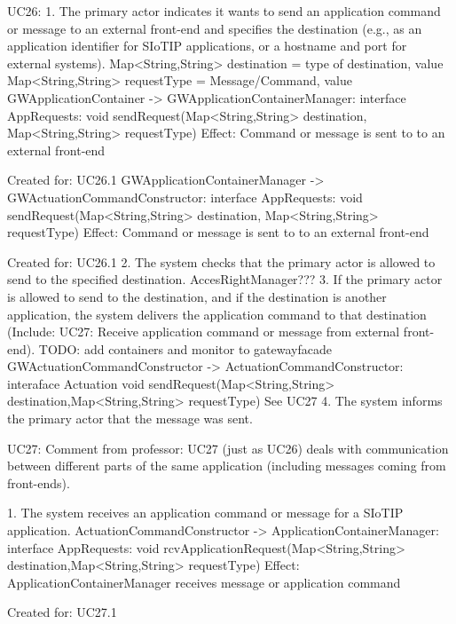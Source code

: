         UC26:
            1. The primary actor indicates it wants to send an application command or message to an external
                front-end and specifies the destination (e.g., as an application identifier for SIoTIP applications,
                or a hostname and port for external systems).
                Map<String,String> destination = type of destination, value
                Map<String,String> requestType = Message/Command, value
                GWApplicationContainer -> GWApplicationContainerManager: interface AppRequests:
                                                   void sendRequest(Map<String,String> destination, Map<String,String> requestType)
                       Effect: Command or message is sent to  to an external front-end
                       \item Created for: UC26.1
                GWApplicationContainerManager -> GWActuationCommandConstructor: interface AppRequests:
                                                      void sendRequest(Map<String,String> destination, Map<String,String> requestType)
                         Effect: Command or message is sent to  to an external front-end
                       \item Created for: UC26.1
            2. The system checks that the primary actor is allowed to send to the specified destination.
            AccesRightManager???
            3. If the primary actor is allowed to send to the destination, and if the destination is another
                application, the system delivers the application command to that destination (Include: UC27:
                Receive application command or message from external front-end).
                TODO: add containers and monitor to gatewayfacade
                GWActuationCommandConstructor -> ActuationCommandConstructor: interaface Actuation
                                        void sendRequest(Map<String,String> destination,Map<String,String> requestType)
                See UC27
            4. The system informs the primary actor that the message was sent.

       UC27:
       Comment from professor:
           UC27 (just as UC26) deals with communication between different parts of the same application (including messages coming from front-ends).

        1. The system receives an application command or message for a SIoTIP application.
            ActuationCommandConstructor -> ApplicationContainerManager: interface AppRequests:
                                                 void rcvApplicationRequest(Map<String,String> destination,Map<String,String> requestType)
                   Effect: ApplicationContainerManager receives message or application command
                   \item Created for: UC27.1


